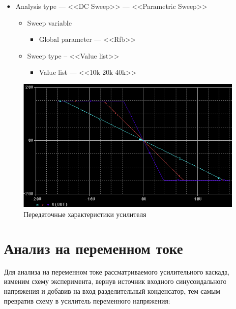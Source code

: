 \documentclass[utf8x, 12pt]{G7-32}
\begin{document}
	\begin{itemize}	
		\item Analysis type --- <<DC Sweep>> --- <<Parametric Sweep>>
		\begin{itemize}	
			\item Sweep variable
			\begin{itemize}	
				\item Global parameter --- <<Rfb>>
			\end{itemize}
			\item Sweep type -- <<Value list>>
			\begin{itemize}	
				\item Value list --- <<10k 20k 40k>>
			\end{itemize}
		\end{itemize}
	\end{itemize}

\begin{figure}[h]
	\begin{center}
		\includegraphics[width=12cm]{img/waveform_2_1}
	\end{center}
	\vspace{-5mm}\caption{Передаточные характеристики усилителя}
\end{figure}	

\newpage


\section{Анализ на переменном токе}

Для анализа на переменном токе рассматриваемого усилительного каскада, изменим схему эксперимента, вернув источник входного синусоидального напряжения и добавив на вход разделительный конденсатор, тем самым превратив схему в усилитель переменного напряжения:
\end{document}
